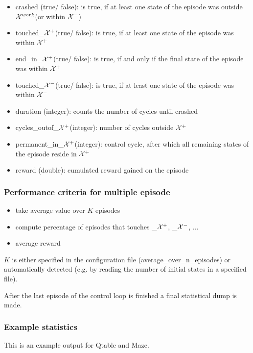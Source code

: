 \documentclass[a4paper,12pt,german]{article}
\newcommand{\Xplus}{{${\cal X}^+$}}
\newcommand{\Xminus}{{${\cal X}^-$}}
\newcommand{\Xwork}{{${\cal X}^{work}$}}
\newcommand{\ite}{\begin{itemize}}
\newcommand{\eti}{\end{itemize}}
\begin{document}
\ite
\item crashed (true/ false): is true, if at least one state of the episode was outside \Xwork (or within \Xminus)
\item touched\_\Xplus (true/ false): is true,  if at least one state of the episode was within \Xplus
\item end\_in\_\Xplus (true/ false): is true, if and only if the final state of the episode was within \Xplus
\item touched\_\Xminus (true/ false): is true,  if at least one state of the episode was within \Xminus
\item duration (integer): counts the number of cycles until crashed 
\item cycles\_outof\_\Xplus (integer): number of cycles outside  \Xplus
\item permanent\_in\_\Xplus (integer): control cycle, after which all remaining states of the episode reside in \Xplus 
\item reward (double): cumulated reward gained on the episode
\eti

\subsubsection{Performance criteria for multiple episode}

\ite
\item take average value over $K$ episodes
\item compute percentage of episodes that touches \_\Xplus, \_\Xminus, ...
\item average reward 
\eti

$K$ is either specified in the configuration file (average\_over\_n\_episodes) or automatically 
detected (e.g. by reading the number of initial states in a specified file).

After the last episode of the control loop is finished a final statistical dump is made.


\subsubsection{Example statistics}

This is an example output for Qtable and Maze.
\end{document}

